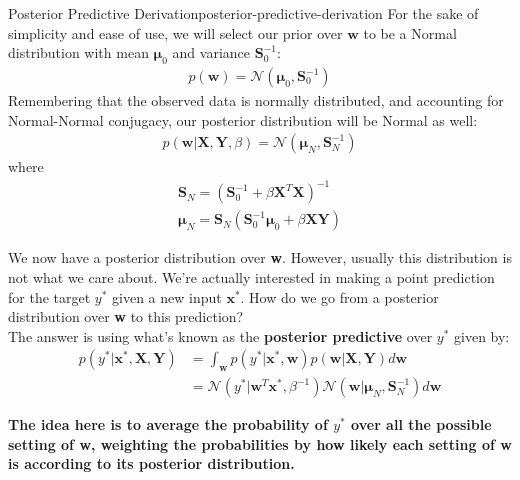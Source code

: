 \begin{derivation}{Posterior Predictive Derivation}{posterior-predictive-derivation}
    For the sake of simplicity and ease of use, we will select our prior over $\textbf{w}$ to be a Normal distribution with mean $\boldsymbol{\mu}_{0}$ and variance $\boldsymbol{S}_{0}^{-1}$:
    \begin{align*}
        p(\textbf{w}) = \mathcal{N}(\boldsymbol{\mu}_{0}, \boldsymbol{S}_{0}^{-1})
    \end{align*}
    Remembering that the observed data is normally distributed, and accounting for Normal-Normal conjugacy, our posterior distribution will be Normal as well:
    \begin{align*}
        p(\textbf{w}|\textbf{X},\textbf{Y}, \beta) = \mathcal{N}(\boldsymbol{\mu}_{N}, \boldsymbol{S}_{N}^{-1})
    \end{align*}
    where
    \begin{align*}
        \boldsymbol{S}_{N} = (\boldsymbol{S}_{0}^{-1} + \beta\textbf{X}^{T}\textbf{X})^{-1} \\
        \boldsymbol{\mu}_{N} = \boldsymbol{S}_{N}(\boldsymbol{S}_{0}^{-1}\boldsymbol{\mu}_{0} + \beta\textbf{X}\textbf{Y})
    \end{align*}

    We now have a posterior distribution over \textbf{w}. However, usually this distribution is not what we care about. We're actually interested in making a point prediction for the target $y^{*}$ given a new input $\textbf{x}^{*}$. How do we go from a posterior distribution over \textbf{w} to this prediction? \\

    The answer is using what's known as the \textbf{posterior predictive} over $y^{*}$ given by:
    \begin{equation}
    \begin{split}
        p(y^{*} | \textbf{x}^{*}, \textbf{X}, \textbf{Y}) &= \int_{\textbf{w}} p(y^{*} | \textbf{x}^{*}, \textbf{w})p(\textbf{w} | \textbf{X}, \textbf{Y})d\textbf{w} \\
        &= \mathcal{N}(y^{*} | \textbf{w}^{T}\textbf{x}^{*}, \beta^{-1})\mathcal{N}(\textbf{w} | \boldsymbol{\mu}_{N}, \boldsymbol{S}_{N}^{-1})d\textbf{w}
    \end{split}
    \end{equation}
\end{derivation}

\textbf{The idea here is to average the probability of $y^{*}$ over all the possible setting of \textbf{w}, weighting the probabilities by how likely each setting of \textbf{w} is according to its posterior distribution.}

